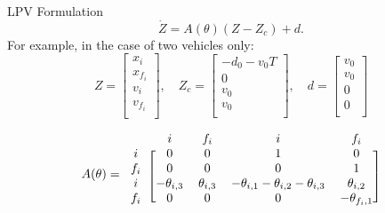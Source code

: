 \documentclass[slideopt,A4,showboxes,svgnames]{beamer}
\begin{document}
\begin{frame}{LPV Formulation}
$$\dot{Z} = A(\theta)(Z-Z_c) + d.$$ For example, in the case of two vehicles only:
\begin{equation*}
Z = \begin{bmatrix}
x_i \\
x_{f_i} \\
v_i \\
v_{f_i} \\
\end{bmatrix}
,\quad
Z_c = \begin{bmatrix}
-d_0-v_0 T \\
0 \\
v_0\\
v_0 \\
\end{bmatrix}
,\quad
d = \begin{bmatrix}
v_0 \\
v_0 \\
0\\
0\\
\end{bmatrix}
\end{equation*}

\begin{equation*}
A(\theta)
=
\begin{blockarray}{ccccc}
& i & f_i & i & f_i \\
\begin{block}{c[cccc]}
i & 0 & 0 & 1 & 0 \\
f_i & 0 & 0 & 0 & 1 \\
i & -\theta_{i,3} & \theta_{i,3} & -\theta_{i,1}-\theta_{i,2}-\theta_{i,3} & \theta_{i,2} \\
f_i & 0 & 0 & 0 & -\theta_{f_i,1} \\
\end{block}
\end{blockarray}
\end{equation*}
\end{frame}
\end{document}
